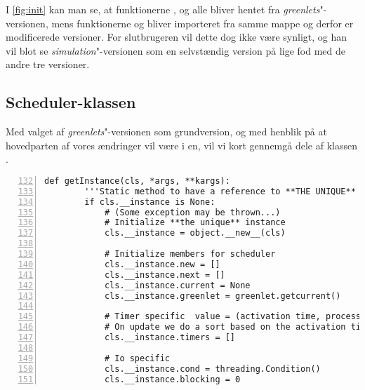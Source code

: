 I \cref{fig:init} kan man se, at funktionerne ,  og  alle bliver hentet fra \emph{greenlets}"-versionen, mens funktionerne  og  bliver importeret fra samme mappe og derfor er modificerede versioner. For slutbrugeren  vil dette dog ikke være synligt, og han vil blot se \emph{simulation}"-versionen som en selvstændig version på lige fod med de andre tre versioner.

\subsection{Scheduler-klassen}
\label{sec:scheduler}
Med valget af \emph{greenlets}"-versionen som grundversion, og med henblik på at hovedparten af vores ændringer vil være i \sched en, vil vi kort gennemgå dele af klassen .

\begin{lstlisting}[firstnumber=132,stepnumber=5,numbers=left, float, label=fig:scheduling, caption=Uddrag af Scheduler.py i \emph{greenlets}versionen.]
    def getInstance(cls, *args, **kargs):
        '''Static method to have a reference to **THE UNIQUE** instance'''
        if cls.__instance is None:
            # (Some exception may be thrown...)
            # Initialize **the unique** instance
            cls.__instance = object.__new__(cls)

            # Initialize members for scheduler
            cls.__instance.new = []
            cls.__instance.next = []
            cls.__instance.current = None
            cls.__instance.greenlet = greenlet.getcurrent()

            # Timer specific  value = (activation time, process)
            # On update we do a sort based on the activation time
            cls.__instance.timers = []

            # Io specific
            cls.__instance.cond = threading.Condition()
            cls.__instance.blocking = 0
\end{lstlisting}

